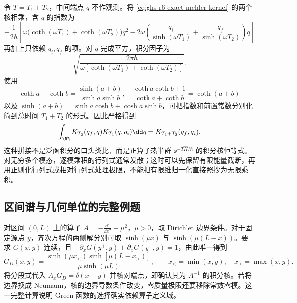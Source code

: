\begin{example}[边界核的半群拼接]

令 $T=T_1+T_2$，中间端点 $q$ 不作观测。将 \cref{eq:ghs-r6-exact-mehler-kernel} 的两个核相乘，含 $q$ 的指数为
\[
-\frac1{2\hbar}\left[\omega\bigl(\coth(\omega T_1)+\coth(\omega T_2)\bigr)q^2
-2\omega\left(\frac{q_i}{\sinh(\omega T_1)}+\frac{q_f}{\sinh(\omega T_2)}\right)q\right]
\]
再加上只依赖 $q_i,q_f$ 的项。对 $q$ 完成平方，积分因子为
\[
\sqrt{\frac{2\pi\hbar}{\omega[\coth(\omega T_1)+\coth(\omega T_2)]}}.
\]
使用
\[
\coth a+\coth b=\frac{\sinh(a+b)}{\sinh a\sinh b},
\quad
\frac{\coth a\coth b+1}{\coth a+\coth b}=\coth(a+b)
\]
以及 $\sinh(a+b)=\sinh a\cosh b+\cosh a\sinh b$，可把指数和前置常数分别化简到总时间 $T_1+T_2$ 的形式。因此严格得到
\begin{equation}\label{eq:ghs-r6-mehler-composition}
\int_\RR K_{T_2}(q_f,q)K_{T_1}(q,q_i)\dd q
=K_{T_1+T_2}(q_f,q_i).
\end{equation}
这种拼接不是泛函积分的口头类比，而是正算子热半群 $\ee^{-T\widehat H/\hbar}$ 的积分核恒等式。对无穷多个模态，逐模乘积的行列式通常发散；这时可以先保留有限能量截断，再用正则化行列式或相对行列式处理极限，不能把有限维归一化直接照抄为无限乘积。

\end{example}

\subsection{区间谱与几何单位的完整例题}
\label{subsec:ghs-feqo-spectral-example}

\begin{example}

对区间 $(0,L)$ 上的算子 $A=-\frac{\dd^2}{\dd x^2}+\mu^2$，$\mu>0$，取 Dirichlet 边界条件。对于固定源点 $y$，齐次方程的两侧解分别可取 $\sinh(\mu x)$ 与 $\sinh(\mu(L-x))$。要求 $G(x,y)$ 连续，且
$-\partial_xG(y^+,y)+\partial_xG(y^-,y)=1$，由此唯一得到
\begin{equation}\label{eq:ghs-feqo-dirichlet-green-interval}
 G_D(x,y)=\frac{\sinh(\mu x_<)\sinh[\mu(L-x_>)]}{\mu\sinh(\mu L)},
 \qquad x_<=\min(x,y),\quad x_>=\max(x,y).
\end{equation}
将分段式代入 $A_xG_D=\delta(x-y)$ 并核对端点，即确认其为 $A^{-1}$ 的积分核。若将边界换成 Neumann，核的边界导数条件改变，零质量极限还要移除常数零模。这一完整计算说明 Green 函数的选择确实依赖算子定义域。

\end{example}


